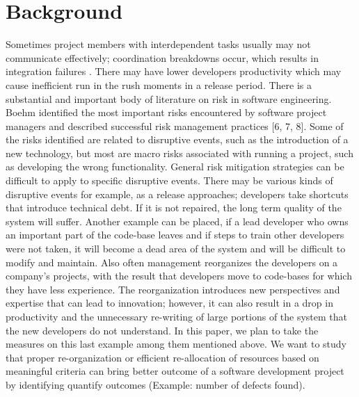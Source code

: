 \documentclass{acm_proc_article-sp}
\begin{document}
\section{Background}
Sometimes project members with interdependent tasks usually may not communicate effectively; coordination breakdowns occur, which results in integration failures \cite{kwan:stechnical}. There may have lower developers productivity \cite{cataldo:identification, damian:awareness} which may cause inefficient run in the rush moments in a release period. There is a substantial and important body of literature on risk in software engineering. Boehm identified the most important risks encountered by software project managers and described successful risk management practices [6, 7, 8]. Some of the risks identified are related to disruptive events, such as the introduction of a new technology, but most are macro risks associated with running a project, such as developing the wrong functionality. General risk mitigation strategies can be difficult to apply to specific disruptive events. There may be various kinds of disruptive events for example, as a release approaches; developers take shortcuts that introduce technical debt. If it is not repaired, the long term quality of the system will suffer. Another example can be placed, if a lead developer who owns an important part of the code-base leaves and if steps to train other developers were not taken, it will become a dead area of the system and will be difficult to modify and maintain. Also often management reorganizes the developers on a company’s projects, with the result that developers move to code-bases for which they have less experience. The reorganization introduces new perspectives and expertise that can lead to innovation; however, it can also result in a drop in productivity and the unnecessary re-writing of large portions of the system that the new developers do not understand.
In this paper, we plan to take the measures on this last example among them mentioned above. We want to study that proper re-organization or efficient re-allocation of resources based on meaningful criteria can bring better outcome of a software development project by identifying quantify outcomes (Example: number of defects found).
\end{document}
